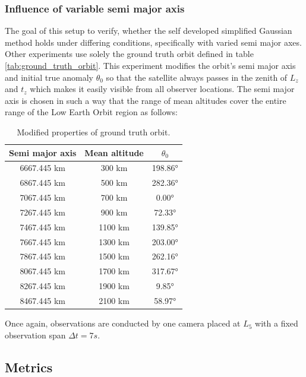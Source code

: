 \documentclass[10pt,a4paper]{article}
\begin{document}
	\subsubsection{Influence of variable semi major axis}
	The goal of this setup to verify, whether the self developed simplified Gaussian method holds under differing conditions, specifically with varied semi major axes. Other experiments use solely the ground truth orbit defined in table \ref{tab:ground_truth_orbit}. This experiment modifies the orbit's semi major axis and initial true anomaly $\theta_0$ so that the satellite always passes in the zenith of $L_z$ and $t_z$ which makes it easily visible from all observer locations. The semi major axis is chosen in such a way that the range of mean altitudes cover the entire range of the Low Earth Orbit region as follows:
	
	\begin{table}[H]
		\centering
		\begin{tabular}{ccc}
			\hline
			Semi major axis & Mean altitude & $\theta_0$ \\
			\hline
			6667.445 km & 300 km  & 198.86° \\
			6867.445 km & 500 km  & 282.36° \\
			7067.445 km & 700 km  & 0.00° \\
			7267.445 km & 900 km  & 72.33° \\
			7467.445 km & 1100 km & 139.85° \\
			7667.445 km & 1300 km & 203.00° \\
			7867.445 km & 1500 km & 262.16° \\
			8067.445 km & 1700 km & 317.67° \\
			8267.445 km & 1900 km & 9.85° \\
			8467.445 km & 2100 km & 58.97° \\
			\hline
		\end{tabular}
		\caption{Modified properties of ground truth orbit.}
		\label{tab:modified_satellite_altitude}
	\end{table}
	\noindent
	Once again, observations are conducted by one camera placed at $L_5$ with a fixed observation span $\Delta t = 7s$.
	
	\subsection{Metrics}
\end{document}
